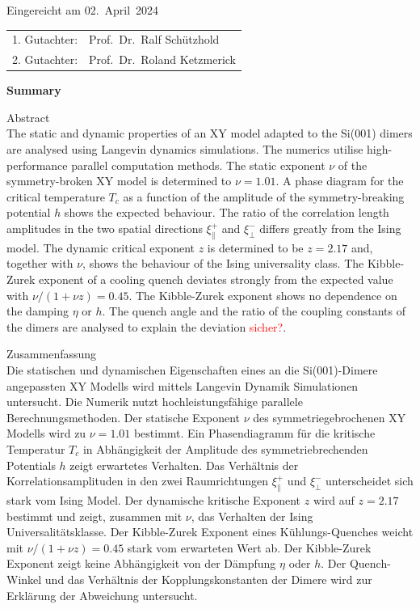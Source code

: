 	
	\thispagestyle{empty}\vspace*{48em}
	
	Eingereicht am 02.~April~2024\vspace{1.5em}
	\par{\large\begin{tabular}{ll}
			1. Gutachter: & Prof.~Dr.~Ralf Schützhold\\
			2. Gutachter: & Prof.~Dr.~Roland Ketzmerick \\
	\end{tabular}}
	
	
	\newpage
	\begin{center}\large\bfseries Summary\end{center}
	
	
	Abstract \\
	The static and dynamic properties of an XY model adapted to the Si(001) dimers are analysed using Langevin dynamics simulations. The numerics utilise high-performance parallel computation methods. The static exponent $\nu$ of the symmetry-broken XY model is determined to $\nu = 1.01$. A phase diagram for the critical temperature $T_c$ as a function of the amplitude of the symmetry-breaking potential $h$ shows the expected behaviour. The ratio of the correlation length amplitudes in the two spatial directions $\xi_\parallel^+$ and $\xi_\perp^-$ differs greatly from the Ising model. The dynamic critical exponent $z$ is determined to be $z=2.17$ and, together with $\nu$, shows the behaviour of the Ising universality class. The Kibble-Zurek exponent of a cooling quench deviates strongly from the expected value with $\nu / (1 + \nu z) = 0.45$. The Kibble-Zurek exponent shows no dependence on the damping $\eta$ or $h$. The quench angle and the ratio of the coupling constants of the dimers are analysed to explain the deviation \textcolor{red}{sicher?}.
	
	\vspace{15em}
	Zusammenfassung \\
	Die statischen und dynamischen Eigenschaften eines an die Si(001)-Dimere angepassten XY Modells wird mittels Langevin Dynamik Simulationen untersucht. Die Numerik nutzt hochleistungsfähige parallele Berechnungsmethoden. Der statische Exponent $\nu$ des symmetriegebrochenen XY Modells wird zu $\nu = 1.01$ bestimmt. Ein Phasendiagramm für die kritische Temperatur $T_c$ in Abhängigkeit der Amplitude des symmetriebrechenden Potentials $h$ zeigt erwartetes Verhalten. Das Verhältnis der Korrelationsamplituden in den zwei Raumrichtungen $\xi_\parallel^+$ und $\xi_\perp^-$ unterscheidet sich stark vom Ising Model. Der dynamische kritische Exponent $z$ wird auf $z=2.17$ bestimmt und zeigt, zusammen mit $\nu$, das Verhalten der Ising Universalitätsklasse. Der Kibble-Zurek Exponent eines Kühlungs-Quenches weicht mit $\nu /	(1 + \nu z) =	0.45 $ stark vom erwarteten Wert ab. Der Kibble-Zurek Exponent zeigt keine Abhängigkeit von der Dämpfung $\eta$ oder $h$. Der Quench-Winkel und das Verhältnis der Kopplungskonstanten der Dimere wird zur Erklärung der Abweichung untersucht.
	
